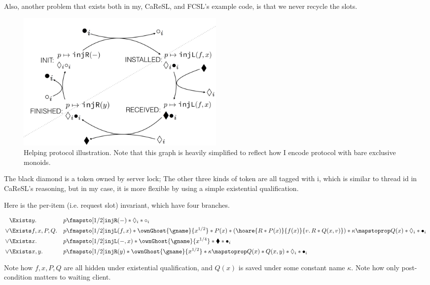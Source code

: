 \documentclass[11pt]{article}
\newcommand{\bdia}{\blacklozenge}
\newcommand{\dia}{\Diamond}
\newcommand{\injR}{\texttt{injR}}
\newcommand{\injL}{\texttt{injL}}
\begin{document}
Also, another problem that exists both in my, CaReSL, and FCSL’s example code, is that we never recycle the slots.

\begin{figure}[hb]
  \centering
  \includegraphics[width=0.5\textwidth]{helping}
  \caption{Helping protocol illustration. Note that this graph is heavily simplified to reflect how I encode protocol with bare exclusive monoids.}
\end{figure}

The black diamond is a token owned by server lock; The other three kinds of token are all tagged with i, which is similar to thread id in CaReSL’s reasoning, but in my case, it is more flexible by using a simple existential qualification.

Here is the per-item (i.e. request slot) invariant, which have four branches.

\begin{align*}
     &\Exists y.          &&p \fmapsto[1/2] \injR(-) * \dia_i * \circ_i\\
\lor &\Exists f, x, P, Q. &&p \fmapsto[1/2] \injL(f, x) * \ownGhost{\gname}{x^{1/2}} *
                           P(x) * (\hoare{R * P(x)}{f(x)}{v.\,R * Q(x, v)}) * \kappa \mapstoprop Q(x) * \dia_i * \bullet_i\\
\lor &\Exists x.          &&p \fmapsto[1/2] \injL(-, x) * \ownGhost{\gname}{x^{1/4}} * \bdia * \bullet_i\\
\lor &\Exists x, y.       &&p \fmapsto[1/2] \injR(y) * \ownGhost{\gname}{x^{1/2}} * \kappa \mapstoprop Q(x) * Q(x, y) * \dia_i * \bullet_i
\end{align*}


Note how $f, x, P, Q$ are all hidden under existential qualification, and $Q(x)$ is saved under some constant name $\kappa$. Note how only post-condition matters to waiting client.
\end{document}
